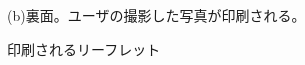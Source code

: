 \begin{figure}[p]
\begin{center}
\hspace{1cm} (b)裏面。ユーザの撮影した写真が印刷される。
\caption{印刷されるリーフレット}
\end{center}
\end{figure}

